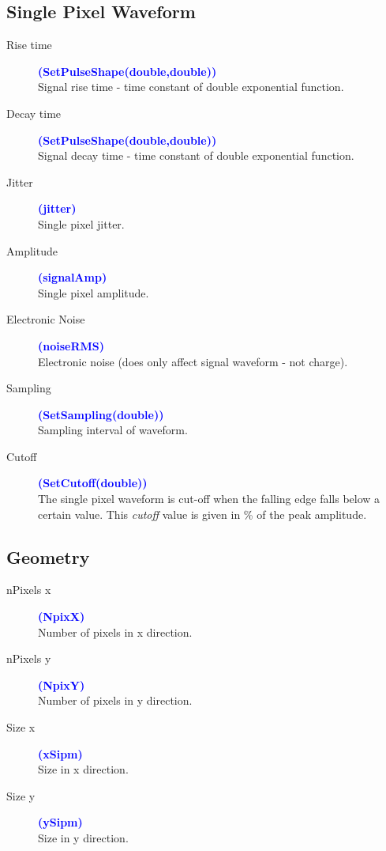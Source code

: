 \subsection*{Single Pixel Waveform}

\begin{description}
	\item[Rise time] \textcolor{blue}{\textbf{(SetPulseShape(double,double))}}\\
		Signal rise time - time constant of double exponential function.
	\item[Decay time] \textcolor{blue}{\textbf{(SetPulseShape(double,double))}}\\
		Signal decay time - time constant of double exponential function.
	\item[Jitter] \textcolor{blue}{\textbf{(jitter)}}\\
		Single pixel jitter.
	\item[Amplitude] \textcolor{blue}{\textbf{(signalAmp)}}\\
		Single pixel amplitude.
	\item[Electronic Noise] \textcolor{blue}{\textbf{(noiseRMS)}}\\
		Electronic noise (does only affect signal waveform - not charge).
	\item[Sampling] \textcolor{blue}{\textbf{(SetSampling(double))}}\\
		Sampling interval of waveform.
	\item[Cutoff] \textcolor{blue}{\textbf{(SetCutoff(double))}}\\
		The single pixel waveform is cut-off when the falling edge falls below a certain value. This \textit{cutoff} value is given in \% of the peak amplitude.
\end{description}

\subsection*{Geometry}

\begin{description}
	\item[nPixels x] \textcolor{blue}{\textbf{(NpixX)}}\\
		Number of pixels in x direction.
	\item[nPixels y] \textcolor{blue}{\textbf{(NpixY)}}\\
		Number of pixels in y direction.
	\item[Size x] \textcolor{blue}{\textbf{(xSipm)}}\\
		Size in x direction.
	\item[Size y] \textcolor{blue}{\textbf{(ySipm)}}\\
		Size in y direction.
\end{description}

